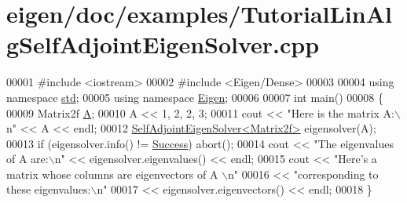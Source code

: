 \hypertarget{eigen_2doc_2examples_2_tutorial_lin_alg_self_adjoint_eigen_solver_8cpp_source}{}\section{eigen/doc/examples/\+Tutorial\+Lin\+Alg\+Self\+Adjoint\+Eigen\+Solver.cpp}
\label{eigen_2doc_2examples_2_tutorial_lin_alg_self_adjoint_eigen_solver_8cpp_source}

\begin{DoxyCode}
00001 \textcolor{preprocessor}{#include <iostream>}
00002 \textcolor{preprocessor}{#include <Eigen/Dense>}
00003 
00004 \textcolor{keyword}{using namespace }\hyperlink{namespacestd}{std};
00005 \textcolor{keyword}{using namespace }\hyperlink{namespace_eigen}{Eigen};
00006 
00007 \textcolor{keywordtype}{int} main()
00008 \{
00009    Matrix2f \hyperlink{group___core___module_class_eigen_1_1_matrix}{A};
00010    A << 1, 2, 2, 3;
00011    cout << \textcolor{stringliteral}{"Here is the matrix A:\(\backslash\)n"} << A << endl;
00012    \hyperlink{group___eigenvalues___module_class_eigen_1_1_self_adjoint_eigen_solver}{SelfAdjointEigenSolver<Matrix2f>} eigensolver(A);
00013    \textcolor{keywordflow}{if} (eigensolver.info() != \hyperlink{group__enums_gga85fad7b87587764e5cf6b513a9e0ee5ea52581b035f4b59c203b8ff999ef5fcea}{Success}) abort();
00014    cout << \textcolor{stringliteral}{"The eigenvalues of A are:\(\backslash\)n"} << eigensolver.eigenvalues() << endl;
00015    cout << \textcolor{stringliteral}{"Here's a matrix whose columns are eigenvectors of A \(\backslash\)n"}
00016         << \textcolor{stringliteral}{"corresponding to these eigenvalues:\(\backslash\)n"}
00017         << eigensolver.eigenvectors() << endl;
00018 \}
\end{DoxyCode}
